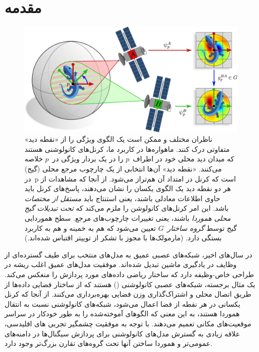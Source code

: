

\section{مقدمه}


\begin{figure}
	\centering
	\vspace*{-2ex}
	\includegraphics[width=.94\textwidth]{figures/satellite_kernels.pdf}
	\caption{\small
		ناظران مختلف  و  ممکن است یک الگوی ویژگی را از «نقطه دید» متفاوتی درک کنند.
		ماهواره‌ها در کاربرد ما، کرنل‌های کانولوشنی هستند که میدان دید محلی خود در اطراف~$p$ را در یک بردار ویژگی در~$p$ خلاصه می‌کنند.
		«نقطه دید» آن‌ها انتخابی از یک چارچوب مرجع محلی (گیج) در~p است که کرنل در امتداد آن هم‌تراز می‌شود.
		از آنجا که مشاهدات از هر دو نقطه دید یک الگوی یکسان را نشان می‌دهند، پاسخ‌های کرنل باید حاوی اطلاعات معادلی باشند، یعنی استنتاج باید \emph{مستقل از مختصات} باشد.
		این امر کرنل‌های کانولوشن را ملزم می‌کند که \emph{تحت تبدیلات گیج محلی هموردا} باشند، یعنی تغییرات چارچوب‌های مرجع.
		سطح هموردایی گیج توسط \emph{گروه ساختار}~$G$ تعیین می‌شود که هم به خمینه و هم به کاربرد بستگی دارد.
		{
			\color{gray}
			\scriptsize
			(مارمولک‌ها با مجوز \href{https://github.com/twitter/twemoji/blob/gh-pages/LICENSE-GRAPHICS}{\underline{}} با تشکر از توییتر اقتباس شده‌اند.)
		}
	}
	\label{fig:satellite}
\end{figure}


در سال‌های اخیر، شبکه‌های عصبی عمیق به مدل‌های منتخب برای طیف گسترده‌ای از وظایف در یادگیری ماشین تبدیل شده‌اند.
موفقیت مدل‌های عمیق اغلب ریشه در طراحی خاص-وظیفه دارد که ساختار ریاضی داده‌های مورد پردازش را منعکس می‌کند.
یک مثال برجسته، شبکه‌های عصبی کانولوشنی (\CNN) هستند که از ساختار فضایی داده‌ها از طریق اتصال محلی و اشتراک‌گذاری وزن فضایی بهره‌برداری می‌کنند.
از آنجا که کرنل یکسانی در هر نقطه از فضا اعمال می‌شود، شبکه‌های کانولوشنی نسبت به انتقال هموردا هستند، به این معنی که الگوهای آموخته‌شده را به طور خودکار در سراسر موقعیت‌های مکانی تعمیم می‌دهند.
با توجه به موفقیت چشمگیر تجربی \CNN{}های اقلیدسی، علاقه زیادی به گسترش مدل‌های کانولوشنی برای پردازش سیگنال‌ها در دامنه‌های عمومی‌تر و هموردا ساختن آنها تحت گروه‌های تقارن بزرگ‌تر وجود دارد.


